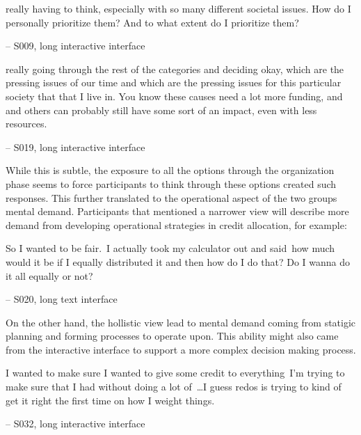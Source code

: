 \begin{displayquote}
\bracketellipsis really having to think, especially with so many different societal issues. How do I personally prioritize them? And to what extent do I prioritize them?
    
\noindent \hfill -- S009, long interactive interface
\end{displayquote}

\begin{displayquote}
\bracketellipsis really going through the rest of the categories and deciding okay, which are the pressing issues of our time and which are the pressing issues for this particular society that that I live in. \bracketellipsis You know these causes need a lot more funding, and and others can probably still have some sort of an impact, even with less resources.

\noindent \hfill -- S019, long interactive interface
\end{displayquote}

While this is subtle, the exposure to all the options through the organization phase seems to force participants to think through these options created such responses. This further translated to the operational aspect of the two groups mental demand. Participants that mentioned a narrower view will describe more demand from developing operational strategies in credit allocation, for example:

\begin{displayquote}
So I wanted to be fair.~\bracketellipsis I actually took my calculator out and said~\bracketellipsis  how much would it be if I equally distributed it and then how do I do that? Do I wanna do it all equally or not?

\noindent \hfill -- S020, long text interface
\end{displayquote}

On the other hand, the hollistic view lead to mental demand coming from statigic planning and forming processes to operate upon. This ability might also came from the interactive interface to support a more complex decision making process.

\begin{displayquote}
I wanted to make sure I wanted to give some credit to everything~\bracketellipsis I'm trying to make sure that I had without doing a lot of~\ldots I guess redos is trying to kind of get it right the first time on how I weight things.

\noindent \hfill -- S032, long interactive interface
\end{displayquote}

